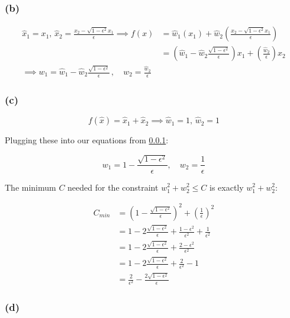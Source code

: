 \documentclass[a4paper,12pt]{article}
\begin{document}
\subsubsection{(b)}
\label{sssec:input-whitening-b}

$$
\begin{aligned}
\hat{x}_1 = x_1, \, \hat{x}_2 = \frac{x_2 - \sqrt{1-\epsilon^2}x_1}{\epsilon} \implies
f(x) & = \hat{w}_1(x_1) + \hat{w}_2\left(\frac{x_2 - \sqrt{1-\epsilon^2}x_1}{\epsilon}\right) \\
    & = \left(\hat{w}_1 - \hat{w}_2\frac{\sqrt{1-\epsilon^2}}{\epsilon}\right)x_1 + \left(\frac{\hat{w}_2}{\epsilon}\right)x_2 \\
    \implies w_1 = \hat{w}_1 - \hat{w}_2\frac{\sqrt{1-\epsilon^2}}{\epsilon} \,, \quad w_2 = \frac{\hat{w}_2}{\epsilon}
\end{aligned}
$$

\subsubsection{(c)}

$$
f(\hat{x}) = \hat{x}_1 + \hat{x}_2 \implies \hat{w}_1 = 1, \, \hat{w}_2 = 1
$$

Plugging these into our equations from \cref{sssec:input-whitening-b}:

$$
w_1 = 1 - \frac{\sqrt{1-\epsilon^2}}{\epsilon}, \quad w_2 = \frac{1}{\epsilon}
$$

The minimum $C$ needed for the constraint $w_1^2 + w_2^2 \le C$ is exactly $w_1^2 + w_2^2$:

$$
\begin{aligned}
C_{min} & = \left(1 - \frac{\sqrt{1-\epsilon^2}}{\epsilon}\right)^2 + \left(\frac{1}{\epsilon}\right)^2 \\
    & = 1 - 2\frac{\sqrt{1-\epsilon^2}}{\epsilon} + \frac{1-\epsilon^2}{\epsilon^2} + \frac{1}{\epsilon^2} \\
    & = 1 - 2\frac{\sqrt{1-\epsilon^2}}{\epsilon} + \frac{2-\epsilon^2}{\epsilon^2} \\
    & = 1 - 2\frac{\sqrt{1-\epsilon^2}}{\epsilon} + \frac{2}{\epsilon^2} - 1 \\
    & = \frac{2}{\epsilon^2} - \frac{2\sqrt{1-\epsilon^2}}{\epsilon}
\end{aligned}
$$

\subsubsection{(d)}
\end{document}
